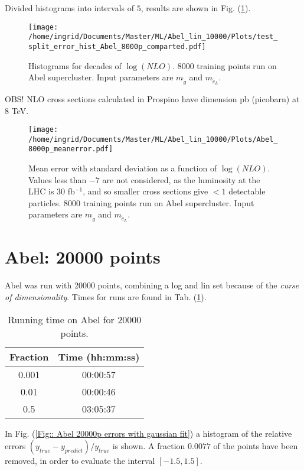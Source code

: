 \documentclass[twoside,english]{uiofysmaster}
\begin{document}
Divided histograms into intervals of $5$, results are shown in Fig. (\ref{Fig:: Abel 8000p error hist divided}).

\begin{figure}
\centering
\texttt{[image: /home/ingrid/Documents/Master/ML/Abel\_lin\_10000/Plots/test\_split\_error\_hist\_Abel\_8000p\_comparted.pdf]}
\caption{Histograms for decades of $\log (NLO)$. 8000 training points run on Abel supercluster. Input parameters are $m_{\tilde{g}}$ and $m_{\tilde{c}_L}$.}
\label{Fig:: Abel 8000p error hist divided}
\end{figure}

OBS! NLO cross sections calculated in Prospino have dimension pb (picobarn) at 8 TeV.

\begin{figure}
\centering
\texttt{[image: /home/ingrid/Documents/Master/ML/Abel\_lin\_10000/Plots/Abel\_8000p\_meanerror.pdf]}
\caption{Mean error with standard deviation as a function of $\log (NLO)$. Values less than $-7$ are not considered, as the luminosity at the LHC is $30$ fb$^{-1}$, and so smaller cross sections give $<1$ detectable particles. 8000 training points run on Abel supercluster. Input parameters are $m_{\tilde{g}}$ and $m_{\tilde{c}_L}$.}
\label{Fig:: Abel 8000p mean error with std}
\end{figure}


\section{Abel: 20000 points}

Abel was run with 20000 points, combining a log and lin set because of the \textit{curse of dimensionality}. Times for runs are found in Tab. (\ref{Tab:: runtime Abel 20000p}).

\begin{table}
\centering
\begin{tabular}{|c|c|}
\hline
Fraction & Time (hh:mm:ss)\\
\hline
0.001 & 00:00:57\\
0.01 & 00:00:46\\
0.5 & 03:05:37\\
\hline
\end{tabular}
\caption{Running time on Abel for 20000 points.}
\label{Tab:: runtime Abel 20000p}
\end{table}

In Fig. (\ref{Fig:: Abel 20000p errors with gaussian fit}) a histogram of the relative errors $(y_{true} - y_{predict})/y_{true}$ is shown. A fraction $0.0077$ of the points have been removed, in order to evaluate the interval $[-1.5,1.5]$.
\end{document}
